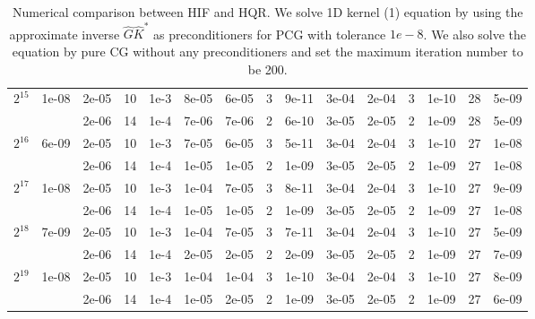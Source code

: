 \documentclass[11pt]{article}
\begin{document}
\begin{table}[!htbp]
\begin{tabular}{|c|c|c|c|c|c|c|c|c|c|c|c|c|c|c|}
\hline
$2^{15}$ & 1e-08 & 2e-05 & 10 & 1e-3 & 8e-05 & 6e-05 & 3 & 9e-11 & 3e-04 & 2e-04 & 3 & 1e-10 & 28 & 5e-09\\
~ & ~ & 2e-06 & 14 & 1e-4 & 7e-06 & 7e-06 & 2 & 6e-10 & 3e-05 & 2e-05 & 2 & 1e-09 & 28 & 5e-09\\
\hline
$2^{16}$ & 6e-09 & 2e-05 & 10 & 1e-3 & 7e-05 & 6e-05 & 3 & 5e-11 & 3e-04 & 2e-04 & 3 & 1e-10 & 27 & 1e-08\\
~ & ~ & 2e-06 & 14 & 1e-4 & 1e-05 & 1e-05 & 2 & 1e-09 & 3e-05 & 2e-05 & 2 & 1e-09 & 27 & 1e-08\\
\hline
$2^{17}$ & 1e-08 & 2e-05 & 10 & 1e-3 & 1e-04 & 7e-05 & 3 & 8e-11 & 3e-04 & 2e-04 & 3 & 1e-10 & 27 & 9e-09\\
~ & ~ & 2e-06 & 14 & 1e-4 & 1e-05 & 1e-05 & 2 & 1e-09 & 3e-05 & 2e-05 & 2 & 1e-09 & 27 & 1e-08\\
\hline
$2^{18}$ & 7e-09 & 2e-05 & 10 & 1e-3 & 1e-04 & 7e-05 & 3 & 7e-11 & 3e-04 & 2e-04 & 3 & 1e-10 & 27 & 5e-09\\
~ & ~ & 2e-06 & 14 & 1e-4 & 2e-05 & 2e-05 & 2 & 2e-09 & 3e-05 & 2e-05 & 2 & 1e-09 & 27 & 7e-09\\
\hline
$2^{19}$ & 1e-08 & 2e-05 & 10 & 1e-3 & 1e-04 & 1e-04 & 3 & 1e-10 & 3e-04 & 2e-04 & 3 & 1e-10 & 27 & 8e-09\\
~ & ~ & 2e-06 & 14 & 1e-4 & 1e-05 & 2e-05 & 2 & 1e-09 & 3e-05 & 2e-05 & 2 & 1e-09 & 27 & 6e-09\\


\end{tabular}

\caption{Numerical comparison between HIF and HQR. We solve 1D kernel (1) equation by using the approximate inverse $\hat{G}\hat{K}^{*}$ as preconditioners for PCG with tolerance $1e-8$. We also solve the equation by pure CG without any preconditioners and set the maximum iteration number to be 200.}
\label{1d-k1}
\end{table}
\end{document}
